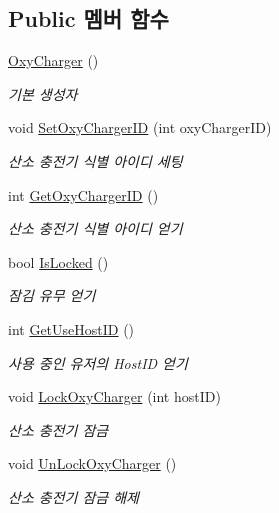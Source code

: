 \subsection*{Public 멤버 함수}
\begin{DoxyCompactItemize}
\item 
\hyperlink{class_oxy_charger_a3aa077d7dc2310cdc7006a178f92f1f7}{Oxy\+Charger} ()
\begin{DoxyCompactList}\small\item\em 기본 생성자 \end{DoxyCompactList}\item 
void \hyperlink{class_oxy_charger_a27f5b27537e10ffb5c140b651de5fa06}{Set\+Oxy\+Charger\+ID} (int oxy\+Charger\+ID)
\begin{DoxyCompactList}\small\item\em 산소 충전기 식별 아이디 세팅 \end{DoxyCompactList}\item 
int \hyperlink{class_oxy_charger_a478c6f15601d6fecab42c7d0c839a870}{Get\+Oxy\+Charger\+ID} ()
\begin{DoxyCompactList}\small\item\em 산소 충전기 식별 아이디 얻기 \end{DoxyCompactList}\item 
bool \hyperlink{class_oxy_charger_a7c8d2121a1ac586b2da477bc305c0f7d}{Is\+Locked} ()
\begin{DoxyCompactList}\small\item\em 잠김 유무 얻기 \end{DoxyCompactList}\item 
int \hyperlink{class_oxy_charger_adcc945553172f5f75af9f64b888d285a}{Get\+Use\+Host\+ID} ()
\begin{DoxyCompactList}\small\item\em 사용 중인 유저의 Host\+ID 얻기 \end{DoxyCompactList}\item 
void \hyperlink{class_oxy_charger_a5d1f80c23638347ca7d5f9338c3a23b0}{Lock\+Oxy\+Charger} (int host\+ID)
\begin{DoxyCompactList}\small\item\em 산소 충전기 잠금 \end{DoxyCompactList}\item 
void \hyperlink{class_oxy_charger_abe01eac96e95d7a667d782829abd51dd}{Un\+Lock\+Oxy\+Charger} ()
\begin{DoxyCompactList}\small\item\em 산소 충전기 잠금 해제 \end{DoxyCompactList}\end{DoxyCompactItemize}
